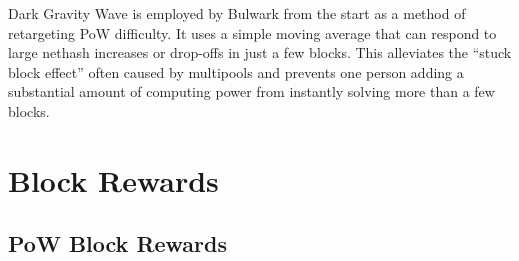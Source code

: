 \documentclass[11pt,a4paperpaper,]{report}
\begin{document}
Dark Gravity Wave is employed by Bulwark from the start as a method of
retargeting PoW difficulty. It uses a simple moving average that can
respond to large nethash increases or drop-offs in just a few blocks.
This alleviates the ``stuck block effect'' often caused by multipools
and prevents one person adding a substantial amount of computing power
from instantly solving more than a few blocks.

\chapter{Block Rewards}\label{block-rewards}

\section{PoW Block Rewards}\label{pow-block-rewards}
\end{document}
